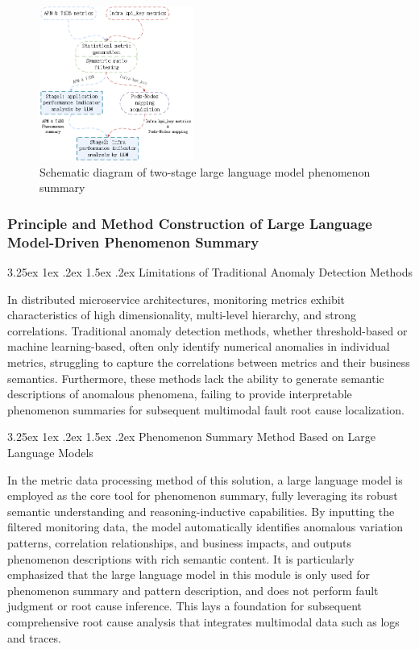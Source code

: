 \documentclass[10pt]{article}
\makeatletter
\renewcommand{\paragraph}{%
    \@startsection{paragraph}{4}{\z@}%
    {3.25ex \@plus1ex \@minus.2ex}%
    {1.5ex \@plus.2ex}%
    {\normalfont\normalsize\itshape}%
}
\makeatother
\begin{document}
\begin{figure}[htbp]
    \centering
    \includegraphics[width=0.45\textwidth]{pics/fig12.png}
    \caption{Schematic diagram of two-stage large language model phenomenon summary}
    \label{fig12}
\end{figure}

\subsubsection{Principle and Method Construction of Large Language Model-Driven Phenomenon Summary}

\paragraph{Limitations of Traditional Anomaly Detection Methods}

In distributed microservice architectures, monitoring metrics exhibit characteristics of high dimensionality, multi-level hierarchy, and strong correlations. Traditional anomaly detection methods, whether threshold-based or machine learning-based, often only identify numerical anomalies in individual metrics, struggling to capture the correlations between metrics and their business semantics. Furthermore, these methods lack the ability to generate semantic descriptions of anomalous phenomena, failing to provide interpretable phenomenon summaries for subsequent multimodal fault root cause localization.

\paragraph{Phenomenon Summary Method Based on Large Language Models}

In the metric data processing method of this solution, a large language model is employed as the core tool for phenomenon summary, fully leveraging its robust semantic understanding and reasoning-inductive capabilities. By inputting the filtered monitoring data, the model automatically identifies anomalous variation patterns, correlation relationships, and business impacts, and outputs phenomenon descriptions with rich semantic content. It is particularly emphasized that the large language model in this module is only used for phenomenon summary and pattern description, and does not perform fault judgment or root cause inference. This lays a foundation for subsequent comprehensive root cause analysis that integrates multimodal data such as logs and traces.
\end{document}
